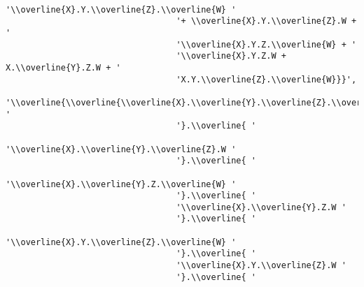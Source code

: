 \begin{verbatim}
                                  '\\overline{X}.Y.\\overline{Z}.\\overline{W} '
                                  '+ \\overline{X}.Y.\\overline{Z}.W + '
                                  '\\overline{X}.Y.Z.\\overline{W} + '
                                  '\\overline{X}.Y.Z.W + X.\\overline{Y}.Z.W + '
                                  'X.Y.\\overline{Z}.\\overline{W}}}',
                                  '\\overline{\\overline{\\overline{X}.\\overline{Y}.\\overline{Z}.\\overline{W} '
                                  '}.\\overline{ '
                                  '\\overline{X}.\\overline{Y}.\\overline{Z}.W '
                                  '}.\\overline{ '
                                  '\\overline{X}.\\overline{Y}.Z.\\overline{W} '
                                  '}.\\overline{ '
                                  '\\overline{X}.\\overline{Y}.Z.W '
                                  '}.\\overline{ '
                                  '\\overline{X}.Y.\\overline{Z}.\\overline{W} '
                                  '}.\\overline{ '
                                  '\\overline{X}.Y.\\overline{Z}.W '
                                  '}.\\overline{ '

\end{verbatim}
